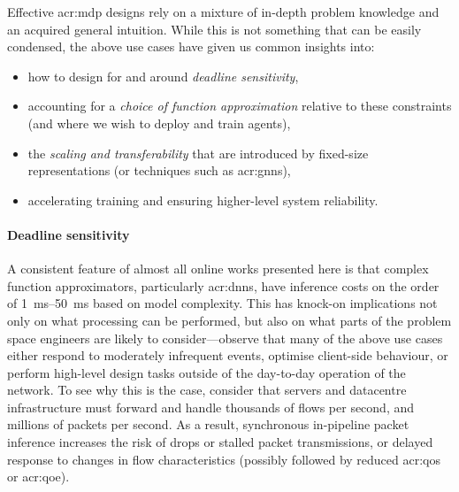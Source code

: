 Effective \gls{acr:mdp} designs rely on a mixture of in-depth problem knowledge and an acquired general intuition.
While this is not something that can be easily condensed, the above use cases have given us common insights into:
\begin{itemize}
	\item how to design for and around \emph{deadline sensitivity},
	\item accounting for a \emph{choice of function approximation} relative to these constraints (and where we wish to deploy and train agents),
	\item the \emph{scaling and transferability} that are introduced by fixed-size representations (or techniques such as \glspl{acr:gnn}),
	\item accelerating training and ensuring higher-level system reliability.
\end{itemize}

\paragraph{Deadline sensitivity}\label{testtt}
A consistent feature of almost all online works presented here is that complex function approximators, particularly \glspl{acr:dnn}, have inference costs on the order of \qtyrange{1}{50}{\milli\second} based on model complexity.
This has knock-on implications not only on what processing can be performed, but also on what parts of the problem space engineers are likely to consider---observe that many of the above use cases either respond to moderately infrequent events, optimise client-side behaviour, or perform high-level design tasks outside of the day-to-day operation of the network.
To see why this is the case, consider that servers and datacentre infrastructure must forward and handle thousands of flows per second, and millions of packets per second.
As a result, synchronous in-pipeline packet inference increases the risk of drops or stalled packet transmissions, or delayed response to changes in flow characteristics (possibly followed by reduced \gls{acr:qos} or \gls{acr:qoe}).

